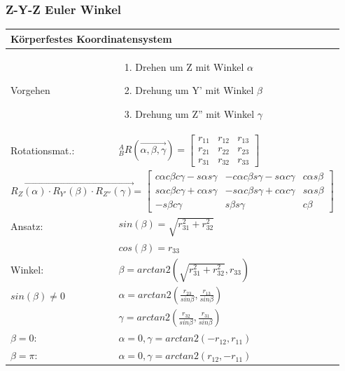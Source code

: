 \begin{minipage}{9.5cm}
    \vspace{0.5cm}
    \subsubsection{Z-Y-Z Euler Winkel }
   	\begin{tabular}{|p{2.5cm}|p{6cm}|}
    \hline
       	\multicolumn{2}{|l|}{Körperfestes Koordinatensystem}\\  	
    \hline
    Vorgehen&
    \vspace{-0.3cm}
    \begin{enumerate}
        \item Drehen um Z mit Winkel $\alpha$
        \item Drehung um Y' mit Winkel $\beta$
        \item Drehung um Z'' mit Winkel $\gamma$\vspace{-0.5cm}
    \end{enumerate}\\
    \hline
       	Rotationsmat.:
   		& ${^A_B}R(\overrightarrow{\alpha,\beta,\gamma}) = 
   			\begin{bmatrix} 
		    	r_{11} & r_{12} & r_{13} \\
       r_{21} & r_{22} & r_{23} \\
       r_{31} & r_{32} & r_{33}                              
   \end{bmatrix}$ \\
	\hline
        \multicolumn{2}{|l|}{{\scriptsize 
        $ \overrightarrow{R_Z(\alpha)\cdot R_{Y'}(\beta) \cdot R_{Z''}(\gamma)}$= $\begin{bmatrix} 
           c\alpha c\beta c\gamma - s \alpha s \gamma &-c\alpha c\beta s\gamma-s\alpha c\gamma &c\alpha s\beta \\
           s\alpha c\beta c\gamma + c \alpha s \gamma& -s\alpha c\beta s\gamma+c\alpha c\gamma & s\alpha s\beta\\
           -s\beta c\gamma& s\beta s\gamma& c\beta
        \end{bmatrix}$
    }}\\\hline 
		Ansatz:
		& $sin(\beta) = \sqrt{r^2_{31} + r^2_{32}}$ \\
		& $cos(\beta) = r_{33}$\\
	\hline
		Winkel:
		& $\beta=arctan2(\sqrt{r^2_{31}+r^2_{32}},r_{33})$\\
		$ sin(\beta) \neq 0 $& $\alpha=arctan2(\frac{r_{23}}{sin\beta},\frac{r_{13}}{sin\beta})$\\
		& $\gamma=arctan2(\frac{r_{32}}{sin\beta},\frac{r_{31}}{sin\beta})$\\
	\hline
		$\beta=0$:
		& $\alpha=0,\gamma=arctan2(-r_{12},r_{11})$\\
		$\beta=\pi$:
		& $\alpha=0,\gamma=arctan2(r_{12},-r_{11})$\\
	\hline
    \end{tabular} 	
\end{minipage}
	

